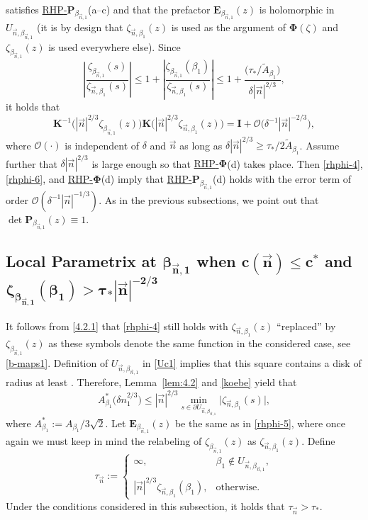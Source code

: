 \documentclass[10pt,a4paper]{amsart}
\numberwithin{equation}{section}
\renewcommand{\det}{\operatorname{det}}
\newcommand{\n}{{\vec n}}
\newcommand{\rhp} {\textnormal{RHP}-${\boldsymbol P}$}
\newcommand{\rhphi} {\textnormal{RHP}-${\boldsymbol \Phi}$}
\begin{document}
satisfies \hyperref[rhp]{\rhp$_{\beta_{\n,1}}$}(a--c) and that the prefactor $\boldsymbol E_{\beta_{\n,1}}(z)$ is holomorphic in $ U_{\n,\beta_{\n,1}} $ (it is by design that $ \zeta_{\n,\beta_1}(z) $ is used as the argument of $ \boldsymbol \Phi(\zeta) $ and $ \zeta_{\beta_{\n,1}}(z) $ is used everywhere else). Since
\[
\left|\frac{\zeta_{\beta_{\n,1}}(s)}{\zeta_{\n,\beta_1}(s)}\right| \leq 1+ \left|\frac{\zeta_{\beta_{\n,1}}(\beta_1)}{\zeta_{\n,\beta_1}(s)}\right| \leq 1 + \frac{\bigl(\tau_*/\tilde A_{\beta_1}\bigr)}{\delta|\n|^{2/3}},
\]
it holds that
\[
\boldsymbol K^{-1} \bigl(|\n|^{2/3}\zeta_{\beta_{\n,1}}(z)\bigr)\boldsymbol K \bigl(|\n|^{2/3}\zeta_{\n,\beta_1}(z)\bigr) = \boldsymbol I + \boldsymbol{\mathcal O}\bigl( \delta^{-1}|\n|^{-2/3} \bigr),
\]
where $ \boldsymbol{\mathcal O}(\cdot) $ is independent of $ \delta $ and $ \n $ as long as $ \delta |\n|^{2/3} \geq \tau_*/2\tilde A_{\beta_1} $. Assume further that $ \delta |\n|^{2/3} $ is large enough so that \hyperref[rhphi]{\rhphi}(d) takes place. Then \eqref{rhphi-4}, \eqref{rhphi-6}, and \hyperref[rhphi]{\rhphi}(d) imply that \hyperref[rhp]{\rhp$_{\beta_{\n,1}}$}(d) holds with the error term of order $ \boldsymbol{\mathcal O}\left(\delta^{-1} |\n|^{-1/3} \right) $. As in the previous subsections, we point out that $ \det \boldsymbol P_{\beta_{\n,1}}(z) \equiv 1 $.


\subsection[Local parametrix at beta\_n,1 when c(n)leq c\^{}* and zeta\_beta\_n,1(beta\_1)]{Local Parametrix at $ \boldsymbol{\beta_{\n,1}} $ when $ \boldsymbol{c(\n)\leq c^* }$ and $ \boldsymbol{\zeta_{\beta_{\n,1}}(\beta_1) > \tau_* |\n|^{-2/3}} $}
\label{ss:65}

It follows from \eqref{4.2.1} that \eqref{rhphi-4} still holds with $ \zeta_{\n,\beta_1}(z) $ ``replaced'' by $ \zeta_{\beta_{\n,1}}(z) $ as these symbols denote the same function in the considered case, see \eqref{b-maps1}. Definition of $ U_{\n,\beta_{\n,1}} $ in \eqref{Uc1} implies that this square contains a disk of radius at least \smash{$ \delta c(\n)/3\sqrt 2 $}. Therefore, Lemma~\ref{lem:4.2} and \eqref{koebe} yield that
\begin{equation}
\label{rhth-1}
A_{\beta_1}^* \bigl(\delta n_1^{2/3}\bigr) \leq |\n|^{2/3} \min_{s\in\partial U_{\n,\beta_{\n,1}}} \big|\zeta_{\n,\beta_1}(s) \big|,
\end{equation}
where $ A_{\beta_1}^*:=A_{\beta_1}/3\sqrt2 $. Let $ \boldsymbol E_{\beta_{\n,1}}(z) $ be the same as in \eqref{rhphi-5}, where once again we must keep in mind the relabeling of $ \zeta_{\beta_{\n,1}}(z) $ as $ \zeta_{\n,\beta_1}(z) $. Define
\[
\tau_\n := \begin{cases}
 \infty, & \beta_1 \not\in U_{\n,\beta_{\n,1}}, \\
 |\n|^{2/3} \zeta_{\n,\beta_1}(\beta_1), & \text{otherwise}.
 \end{cases}
\]
Under the conditions considered in this subsection, it holds that $ \tau_\n>\tau_* $.
\end{document}
